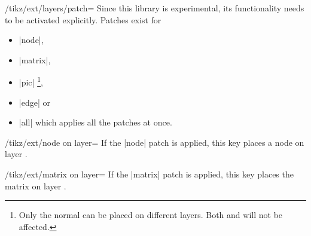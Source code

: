 \begin{multicols}{2}
\begin{key}{/tikz/ext/layers/patch=}
Since this library is experimental, its functionality needs to be activated explicitly.
Patches exist for
\begin{itemize}
\item |node|,
\item |matrix|,
\item |pic|%
  \footnote{Only the normal 
            can be placed on different layers.
            Both 
            and 
            will not be affected.},
\item |edge| or
\item |all| which applies all the patches at once.
\end{itemize}
\end{key}
%

\newcolumn
\begin{key}{/tikz/ext/node on layer=}
If the |node| patch is applied, this key places a node on layer .
\end{key}

\begin{key}{/tikz/ext/matrix on layer=}
If the |matrix| patch is applied, this key places the matrix on layer .
\end{key}


\end{multicols}
